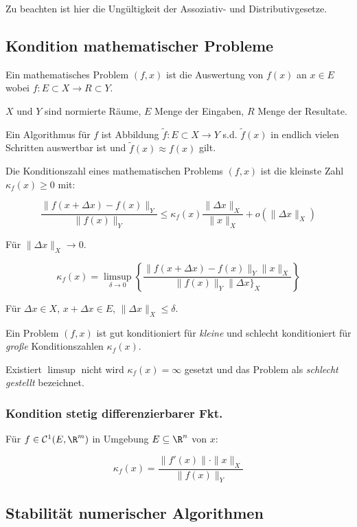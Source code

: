 Zu beachten ist hier die Ungültigkeit der Assoziativ- und Distributivgesetze.

\subsection*{Kondition mathematischer Probleme}

Ein mathematisches Problem $(f,x)$ ist die Auswertung von $f(x)$ an $x \in E$ wobei $f : E \subset X \to R \subset Y$.

$X$ und $Y$ sind normierte Räume, $E$ Menge der Eingaben, $R$ Menge der Resultate.

Ein Algorithmus für $f$ ist Abbildung $\tilde f : E \subset X \to Y$ s.d. $\tilde f(x)$ in endlich vielen Schritten auswertbar ist und $\tilde f(x) \approx f(x)$ gilt.

Die Konditionszahl eines mathematischen Problems $(f, x)$ ist die kleinste Zahl $\kappa_f(x) \geq 0$ mit:

\vspace*{-4mm}
$$\frac{\|f(x + \Delta x) - f(x) \|_Y}{\|f(x)\|_Y} \leq \kappa_f(x) \frac{\|\Delta x\|_X}{\|x\|_X} + o(\|\Delta x \|_X)$$

Für $\|\Delta x\|_X \rightarrow 0$.

\vspace*{-4mm}
$$\kappa_f(x) = \limsup_{\delta \to 0} \left\{ \frac{\|f(x+\Delta x) - f(x)\|_Y \|x\|_X}{\|f(x)\|_Y \|\Delta x\}_X} \right\}$$

Für $\Delta x \in X$, $x + \Delta x \in E$, $\|\Delta x\|_X \leq \delta$.

Ein Problem $(f, x)$ ist gut konditioniert für \emph{kleine} und schlecht konditioniert für \emph{große} Konditionszahlen $\kappa_f(x)$.

Existiert $\limsup$ nicht wird $\kappa_f(x)=\infty$ gesetzt und das Problem als \emph{schlecht gestellt} bezeichnet.


\subsubsection*{Kondition stetig differenzierbarer Fkt.}

Für $f \in \mathcal{C}^1(E, \R^m)$ in Umgebung $E \subseteq \R^n$ von $x$:

\vspace*{-2mm}
$$\kappa_f(x) = \frac{\|f'(x)\| \cdot \|x\|_X}{\|f(x)\|_Y}$$

\subsection*{Stabilität numerischer Algorithmen}

